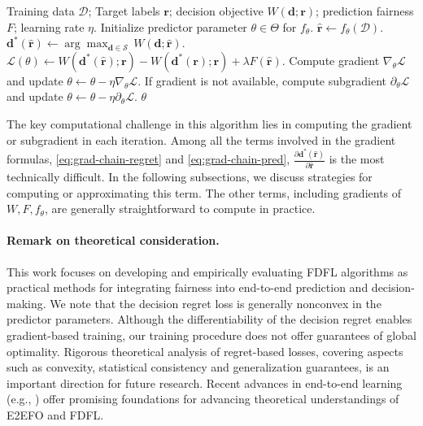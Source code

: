 \documentclass[ijoc,sglanonrev]{informs4}
\begin{document}
\begin{algorithm}[ht]
\caption{Gradient-based Training for Fair Decision Focused Learning}
\label{alg:dfl}
\small  %
\setlength{\abovedisplayskip}{3pt}  %
\setlength{\belowdisplayskip}{3pt}
\begin{algorithmic}[1]
\Require Training data $\mathcal{D}$; Target labels $\mathbf{r}$; decision objective $W(\mathbf{d};\mathbf{r})$; prediction fairness $F$; learning rate $\eta$.
\State Initialize predictor parameter $\theta \in \Theta$ for $f_{\theta}$.
    \State $\hat{\mathbf{r}} \gets f_\theta(\mathcal{D})$. 
    \State $\mathbf{d}^*(\hat{\mathbf{r}}) \gets \arg\max_{\mathbf{d}\in\mathcal{S}}\,W(\mathbf{d};\hat{\mathbf{r}})$. 
    \State $\mathcal{L}(\theta) \gets W(\mathbf{d}^*(\hat{\mathbf{r}});\mathbf{r}) - W(\mathbf{d}^*(\mathbf{r});\mathbf{r}) + \lambda F(\hat{\mathbf{r}})$. 
    \State Compute gradient $\nabla_{\theta}\mathcal{L}$ and update $\theta \gets \theta - \eta\nabla_{\theta}\mathcal{L}$. 
    \State If gradient is not available, compute subgradient $\partial_{\theta}\mathcal{L}$ and update $\theta \gets \theta - \eta\partial_{\theta}\mathcal{L}$.
\EndFor
\State \Return $\theta$
\end{algorithmic}
\end{algorithm}

The key computational challenge in this algorithm lies in computing the gradient or subgradient in each iteration. Among all the terms involved in the gradient formulas, \eqref{eq:grad-chain-regret} and \eqref{eq:grad-chain-pred}, $\frac{\partial \mathbf{d}^*(\hat{\mathbf{r}})}{\partial \hat{\mathbf{r}}}$ is the most technically difficult. In the following subsections, we discuss strategies for computing or approximating this term. The other terms, including gradients of $W, F, f_{\theta}$, are generally straightforward to compute in practice. 

\paragraph{Remark on theoretical consideration.}
This work focuses on developing and empirically evaluating FDFL algorithms as practical methods for integrating fairness into end-to-end prediction and decision-making. We note that the decision regret loss is generally nonconvex in the predictor parameters. Although the differentiability of the decision regret enables gradient-based training, our training procedure does not offer guarantees of global optimality. Rigorous theoretical analysis of regret-based losses, covering aspects such as convexity, statistical consistency and generalization guarantees, is an important direction for future research. Recent advances in end-to-end learning (e.g., \cite{ho2022risk,elmachtoub2023estimate}) offer promising foundations for advancing theoretical understandings of E2EFO and FDFL.
\end{document}
